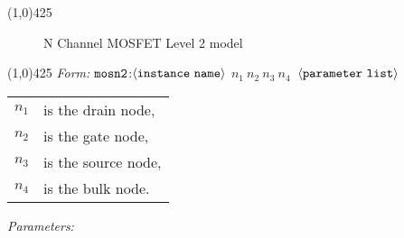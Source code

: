 \documentclass{article}
\begin{document}
\hrulefill\linethickness{0.5mm}\line(1,0){425}
\normalsize
\newline
\begin{figure}[h]
\centerline{\epsfxsize=4in} \caption{N Channel MOSFET
Level 2 model}
\end{figure}
\newline
\linethickness{0.5mm} \line(1,0){425}
\newline
\textit{Form:}
\newline
$\tt mosn2$:$\langle \tt{instance\ name}\rangle$ $n_1\ n_2\ n_3\
n_4\ $ $\langle \tt{parameter\ list}\rangle$
\newline
\begin{tabular}{r l}
$n_1$ & is the drain node, \\
$n_2$ & is the gate node, \\
$n_3$ & is the source node, \\
$n_4$ & is the bulk node. \\
\end{tabular}
\newline
\textit{Parameters:}
\end{document}
